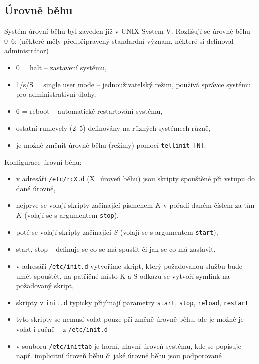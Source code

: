 \documentclass[a4paper, 11pt]{article}
\newcommand{\tcmd}[1]{\texttt{#1}}
\newcommand{\lpath}[1]{\texttt{#1}}
\begin{document}
\newpage

\subsection{Úrovně běhu}
Systém úrovní běhu byl zaveden již v UNIX System V. Rozlišují se úrovně běhu 0--6: (některé měly předpřipravený standardní význam, některé si definoval administrátor)
\begin{itemize}
    \item 0 = halt -- zastavení systému,
    \item 1/s/S = single user mode -- jednouživatelský režim, používá správce systému pro administrativní úlohy,
    \item 6 = reboot -- automatické restartování systému,
    \item ostatní runlevely (2--5) definovány na různých systémech různě,
    \item je možné změnit úrovně běhu (režimy) pomocí \tcmd{tellinit [N]}.
\end{itemize}
 
Konfigurace úrovní běhu:
\begin{itemize}
    \item v adresáři \lpath{/etc/rcX.d} (X=úroveň běhu) jsou skripty spouštěné při vstupu do dané úrovně,
    \item nejprve se volají skripty začínající písmenem $K$ v pořadí daném číslem za tím $K$ (volají se s argumentem \tcmd{stop}),
    \item poté se volají skripty začínající $S$ (volají se s argumentem \tcmd{start}),
    \item start, stop -- definuje se co se má spustit či jak se co má zastavit,
    \item v adresáři \lpath{/etc/init.d} vytvoříme skript, který požadovanou službu bude umět spouštět, na patřičné místo K a S odkazů se vytvoří symlink na požadovaný skript,
    \item skripty v \lpath{init.d} typicky přijímají parametry \tcmd{start}, \tcmd{stop}, \tcmd{reload}, \tcmd{restart}
    \item tyto skripty se nemusí volat pouze při změně úrovně běhu, ale je možné je volat i ručně -- z \lpath{/etc/init.d}
    \item v souboru \lpath{/etc/inittab} je horní, hlavní úroveň systému, kde se popisuje např. implicitní úroveň běhu či jaké úrovně běhu jsou podporované
\end{itemize}
\end{document}
